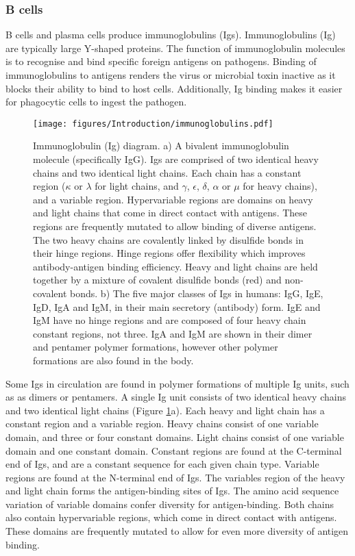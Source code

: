 \subsubsection{B cells}
B cells and plasma cells produce immunoglobulins (Igs).
Immunoglobulins (Ig) are typically large Y-shaped proteins.
The function of immunoglobulin molecules is to recognise and bind specific foreign antigens on pathogens.
Binding of immunoglobulins to antigens renders the virus or microbial toxin inactive as it blocks their ability to bind to host cells.
Additionally, Ig binding makes it easier for phagocytic cells to ingest the pathogen\cite{alberts2007molecularimmune}.
\begin{figure}[htb]
\centering\texttt{[image: figures/Introduction/immunoglobulins.pdf]}
\caption[Immunoglobulins diagram]{Immunoglobulin (Ig) diagram.
a) A bivalent immunoglobulin molecule (specifically IgG).
Igs are comprised of two identical heavy chains and two identical light chains.
Each chain has a constant region ($\kappa$ or $\lambda$ for light chains, and $\gamma$, $\epsilon$, $\delta$, $\alpha$ or $\mu$ for heavy chains), and a variable region.
Hypervariable regions are domains on heavy and light chains that come in direct contact with antigens.
These regions are frequently mutated to allow binding of diverse antigens.
The two heavy chains are covalently linked by disulfide bonds in their hinge regions.
Hinge regions offer flexibility which improves antibody-antigen binding efficiency.
Heavy and light chains are held together by a mixture of covalent disulfide bonds (red) and non-covalent bonds.
b) The five major classes of Igs in humans: IgG, IgE, IgD, IgA and IgM, in their main secretory (antibody) form.
IgE and IgM have no hinge regions and are composed of four heavy chain constant regions, not three.
IgA and IgM are shown in their dimer and pentamer polymer formations, however other polymer formations are also found in the body.}
\label{fig:immunoglobulins_diagram}\end{figure}

Some Igs in circulation are found in polymer formations of multiple Ig units, such as as dimers or pentamers.
A single Ig unit consists  of two identical heavy chains and two identical light chains (Figure \ref{fig:immunoglobulins_diagram}a).
Each heavy and light chain has a constant region and a variable region.
Heavy chains consist of one variable domain, and three or four constant domains.
Light chains consist of one variable domain and one constant domain.
Constant regions are found at the C-terminal end of Igs, and are a constant sequence for each given chain type.
Variable regions are found at the N-terminal end of Igs.
The variables region of the heavy and light chain forms the antigen-binding sites of Igs.
The amino acid sequence variation of variable domains confer diversity for antigen-binding.
Both chains also contain hypervariable regions, which come in direct contact with antigens.
These domains are frequently mutated to allow for even more diversity of antigen binding\cite{schroeder2010structure}.

